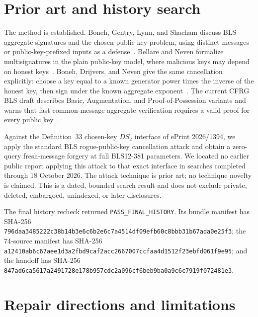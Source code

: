 \documentclass[10pt,a4paper]{article}
\begin{document}
\section{Prior art and history search}

The method is established. Boneh, Gentry, Lynn, and Shacham discuss BLS
aggregate signatures and the chosen-public-key problem, using distinct
messages or public-key-prefixed inputs as a defense~\cite{bgls}. Bellare and
Neven formalize multisignatures in the plain public-key model, where malicious
keys may depend on honest keys~\cite{bn}. Boneh, Drijvers, and Neven give the
same cancellation explicitly: choose a key equal to a known generator power
times the inverse of the honest key, then sign under the known aggregate
exponent~\cite{bdn}. The current CFRG BLS draft describes Basic, Augmentation,
and Proof-of-Possession variants and warns that fast common-message aggregate
verification requires a valid proof for every public key~\cite{cfrg}.

Against the Definition~33 chosen-key $DS_2$ interface of ePrint 2026/1394,
we apply the standard BLS rogue-public-key cancellation attack and obtain a
zero-query fresh-message forgery at full BLS12-381 parameters. We located no
earlier public report applying this attack to that exact interface in searches
completed through 18 October 2026. The attack technique is prior art; no
technique novelty is claimed. This is a dated, bounded search result and does
not exclude private, deleted, embargoed, unindexed, or later disclosures.

The final history recheck returned \texttt{PASS\_FINAL\_HISTORY}. Its bundle
manifest has SHA-256
\texttt{796daa3485222c38b14b3e6c6b2e6c7a4514df09efb60c8bbb31b67ada0e25f3};
the 74-source manifest has SHA-256
\texttt{a12410ab6c67aee1d3a2fbd9caf2acc2667007ccfaa4d1512f23ebfd061f9e95};
and the handoff has SHA-256
\texttt{847ad6ca5617a2491728e178b957cdc2a096cf6beb9ba0a9c6c7919f072481e3}.

\section{Repair directions and limitations}
\end{document}
